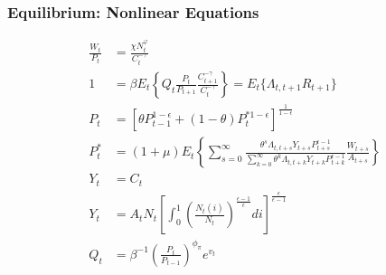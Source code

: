 \documentclass[english,xcolor=svgnames]{beamer}
\begin{document}

\begin{frame}
\frametitle{Equilibrium: Nonlinear Equations
}
\begin{align*}
	\frac{W_t}{P_t}&=\frac{\chi N_t^\varphi}{C_t^{-\gamma}} \\
	1&=\beta E_t\left\{Q_t \frac{P_t}{P_{t+1}} \frac{C_{t+1}^{-\gamma}}{C_{t}^{-\gamma}}\right\}=E_{t}\{\Lambda_{t,t+1}R_{t+1}\} \\
	P_t&=\left[\theta P_{t-1}^{1-\epsilon} + (1-\theta) P_{t}^{*1-\epsilon}\right]^{\frac{1}{1-\epsilon}} \\
	P_t^* &=  (1+\mu)E_t\left\{\sum_{s=0}^{\infty}\frac{\theta^s\Lambda_{t,t+s}Y_{t+s}P_{t+s}^{\epsilon-1}}{\sum_{k=0}^{\infty}\theta^k\Lambda_{t,t+k}Y_{t+k}P_{t+k}^{\epsilon-1}}\frac{W_{t+s}}{A_{t+s}}\right\} \\
	Y_t&=C_t \\
Y_t&=A_tN_t\left[\int_0^1\left(\frac{N_t(i)}{N_t}\right)^{\frac{\epsilon-1}{\epsilon}}di\right]^{\frac{\epsilon}{\epsilon-1}} \\
	Q_t &= \beta^{-1}\left(\frac{P_t}{P_{t-1}}\right)^{\phi_{\pi}}e^{v_t}
\end{align*}
\end{frame}
\end{document}
